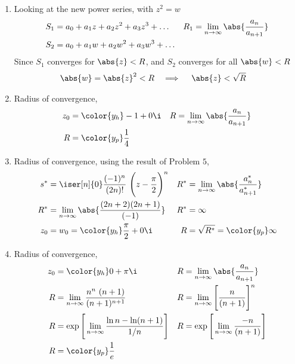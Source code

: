 \begin{enumerate}
    \item Looking at the new power series, with $ z^2 = w $
          \begin{align}
              S_1 & = a_0 + a_1z + a_2z^2 + a_3z^3 + \dots          &
              R_1 & = \lim_{n \to \infty} \abs{\frac{a_n}{a_{n+1}}}   \\
              S_2 & = a_0 + a_1w + a_2w^2 + a_3w^3 + \dots
          \end{align}
          Since $ S_1 $ converges for $ \abs{z} < R $, and $ S_2 $ converges for all
          $ \abs{w} < R $
          \begin{align}
              \abs{w} = \abs{z}^2 & < R & \implies \quad \abs{z} & < \sqrt{R}
          \end{align}

    \item Radius of convergence,
          \begin{align}
              z_0 & = \color{y_h} -1 + 0\i                          &
              R   & = \lim_{n \to \infty} \abs{\frac{a_n}{a_{n+1}}}   \\
              R   & = \color{y_p} \frac{1}{4}
          \end{align}

    \item Radius of convergence, using the result of Problem $ 5 $,
          \begin{align}
              s^*      & = \iser[n]{0} \frac{(-1)^n}{(2n)!}
              \ \Bigg( z - \frac{\pi}{2}
              \Bigg)^n &
              R^*      & = \lim_{n \to \infty} \abs{\frac{a_n^*}{a_{n+1}^*}}     \\
              R^*      & = \lim_{n \to \infty} \abs{\frac{(2n+2)(2n+1)}{(-1)}} &
              R^*      & = \infty                                                \\
              z_0      & = w_0 = \color{y_h} \frac{\pi}{2} + 0\i               &
              R        & = \sqrt{R^*} = \color{y_p} \infty
          \end{align}

    \item Radius of convergence,
          \begin{align}
              z_0    & = \color{y_h} 0 + \pi\i                                       &
              R      & = \lim_{n \to \infty} \abs{\frac{a_n}{a_{n+1}}}                 \\
              R      & = \lim_{n \to \infty} \frac{n^n\ (n+1)}{(n+1)^{n+1}}          &
              R      & = \lim_{n \to \infty} \Bigg[\frac{n}{(n+1)}\Bigg]^n             \\
              R      & = \exp \Bigg[\lim_{n \to \infty} \frac{\ln n - \ln(n+1)}{1/n}
              \Bigg] &
              R      & = \exp \Bigg[\lim_{n \to \infty} \frac{-n}{(n+1)}
              \Bigg]                                                                   \\
              R      & = \color{y_p} \frac{1}{e}
          \end{align}


\end{enumerate}

